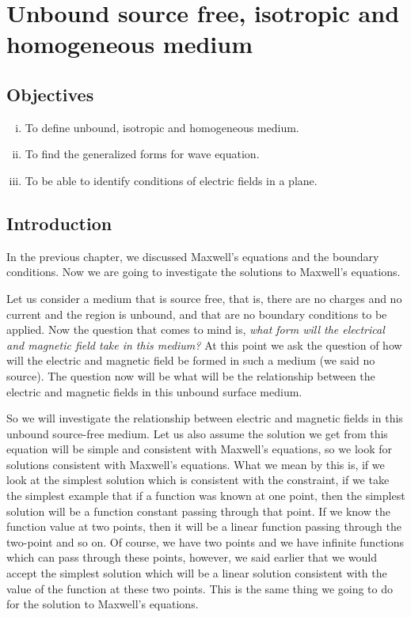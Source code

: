 \chapter[short title]{Unbound source free, isotropic and homogeneous medium}\label{lec:lec21}
\begin{mdframed}[backgroundcolor=lightblue, hidealllines=true]
\section{Objectives}
\begin{enumerate}[(i)]
\item To define unbound, isotropic and homogeneous medium.
\item To find the generalized forms for wave equation.
\item To be able to identify conditions of electric fields in a plane.
\end{enumerate}
\end{mdframed}

\section{Introduction}
In the previous chapter, we discussed Maxwell's equations and the boundary conditions. Now we are going to investigate the solutions to Maxwell's equations.

Let us consider a medium that is source free, that is, there are no charges and no current and the region is unbound, and that are no boundary conditions to be applied. Now the question that comes to mind is, \emph{what form will the electrical and magnetic field take in this medium?} At this point we ask the question of how will the electric and magnetic field be formed in such a medium (we said no source). The question now will be what will be the relationship between the electric and magnetic fields in this unbound surface medium.

So we will investigate the relationship between electric and magnetic fields in this unbound source-free medium. Let us also assume the solution we get from this equation will be simple and consistent with Maxwell's equations, so we look for solutions consistent with Maxwell's equations. What we mean by this is, if we look at the simplest solution which is consistent with the constraint, if we take the simplest example that if a function was known at one point, then the simplest solution will be a function constant passing through that point. If we know the function value at two points, then it will be a linear function passing through the two-point and so on. Of course, we have two points and we have infinite functions which can pass through these points, however, we said earlier that we would accept the simplest solution which will be a linear solution consistent with the value of the function at these two points. This is the same thing we going to do for the solution to Maxwell's equations. 

